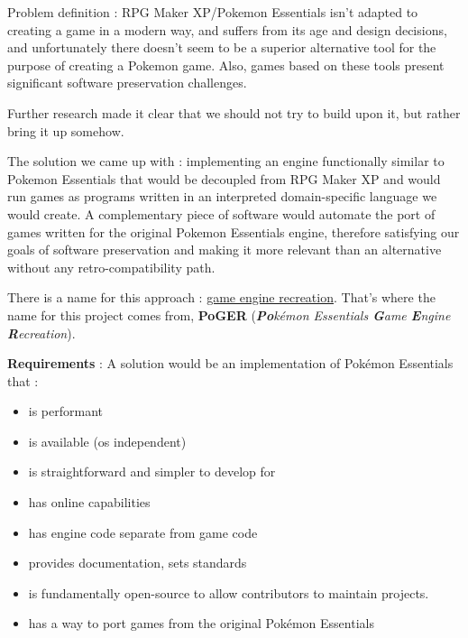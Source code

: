 \documentclass[11pt]{article}
\begin{document}

Problem definition : RPG Maker XP/Pokemon Essentials isn't adapted to creating a game in a modern way, and suffers from its age and design decisions, and unfortunately there doesn't seem to be a superior alternative tool for the purpose of creating a Pokemon game. Also, games based on these tools present significant software preservation challenges.

Further research made it clear that we should not try to build upon it, but rather bring it up somehow.


The solution we came up with : implementing an engine functionally similar to Pokemon Essentials that would be decoupled from RPG Maker XP  and would run games as programs written in an interpreted domain-specific language we would create. A complementary piece of software would automate the port of games written for the original Pokemon Essentials engine, therefore satisfying our goals of software preservation and making it more relevant than an alternative without any retro-compatibility path.

There is a name for this approach : \href{https://en.wikipedia.org/wiki/Game_engine_recreation}{game engine recreation}.  That's where the name for this project comes from, \textbf{PoGER} (\textit{\textbf{Po}kémon Essentials \textbf{G}ame \textbf{E}ngine \textbf{R}ecreation}).

\textbf{Requirements} : A solution would be an implementation of Pokémon Essentials that : 
\begin{itemize}
	\item is performant
	\item is available (os independent)
	\item is straightforward and simpler to develop for
	\item has online capabilities
	\item has engine code separate from game code
	\item provides documentation, sets standards
	\item is fundamentally open-source to allow contributors to maintain projects.
	\item has a way to port games from the original Pokémon Essentials
\end{itemize}
\end{document}
